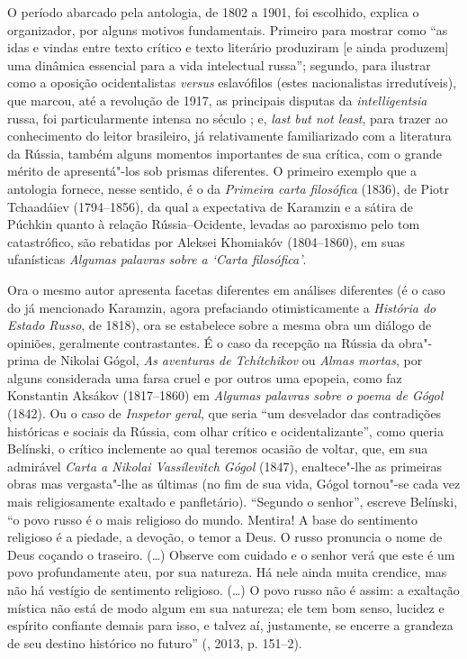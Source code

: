 O período abarcado pela antologia, de 1802 a 1901, foi escolhido, explica o
organizador, por alguns motivos fundamentais. Primeiro para mostrar como
``as idas e vindas entre texto crítico e texto literário produziram [e ainda produzem] uma dinâmica essencial para a vida intelectual
russa''; segundo, para ilustrar como a oposição ocidentalistas \emph{versus}
eslavófilos (estes nacionalistas irredutíveis), que marcou, até a revolução
de 1917, as principais disputas da \emph{intelligentsia} russa, foi
particularmente intensa no século ; e, \emph{last but not least}, para
trazer ao conhecimento do leitor brasileiro, já relativamente
familiarizado com a literatura da Rússia, também alguns momentos
importantes de sua crítica, com o grande mérito de apresentá"-los sob
prismas diferentes. O primeiro exemplo que a antologia fornece, nesse sentido, é o da \emph{Primeira carta filosófica} (1836), de Piotr Tchaadáiev (1794--1856), da qual a
expectativa de Karamzin e a sátira de Púchkin quanto à relação
Rússia--Ocidente, levadas ao paroxismo pelo tom catastrófico, são
rebatidas por Aleksei Khomiakóv (1804--1860), em suas ufanísticas \emph{Algumas
palavras sobre a `Carta filosófica'}.

Ora o mesmo autor apresenta facetas diferentes em análises diferentes (é o caso do já mencionado Karamzin, agora prefaciando otimisticamente a
\emph{História do Estado Russo}, de 1818), ora se estabelece sobre a
mesma obra um diálogo de opiniões, geralmente contrastantes. É o caso da
recepção na Rússia da obra"-prima de Nikolai Gógol, \emph{As aventuras de Tchítchikov} ou \emph{Almas mortas}, por alguns considerada uma
farsa cruel e por outros uma epopeia, como faz Konstantin Aksákov (1817--1860) em
\emph{Algumas palavras sobre o poema de Gógol} (1842). Ou o caso de \emph{Inspetor geral}, que seria ``um desvelador das contradições históricas e
sociais da Rússia, com olhar crítico e ocidentalizante'', como queria
Belínski, o crítico inclemente ao qual teremos ocasião de
voltar, que, em sua admirável \emph{Carta a Nikolai Vassílevitch Gógol} (1847), enaltece"-lhe as primeiras obras mas vergasta"-lhe as últimas (no fim de sua vida, Gógol tornou"-se cada vez mais religiosamente exaltado
e panfletário). ``Segundo o senhor'', escreve Belínski, ``o povo russo
é o mais religioso do mundo. Mentira! A base do sentimento religioso é a
piedade, a devoção, o temor a Deus. O russo pronuncia o nome de Deus
coçando o traseiro. (\ldots{}) Observe com cuidado e o senhor verá que este é
um povo profundamente ateu, por sua natureza. Há nele ainda muita
crendice, mas não há vestígio de sentimento religioso. (\ldots{}) O povo
russo não é assim: a exaltação mística não está de modo algum em sua
natureza; ele tem bom senso, lucidez e espírito confiante demais para
isso, e talvez aí, justamente, se encerre a grandeza de seu destino
histórico no futuro'' (, 2013, p. 151--2).

